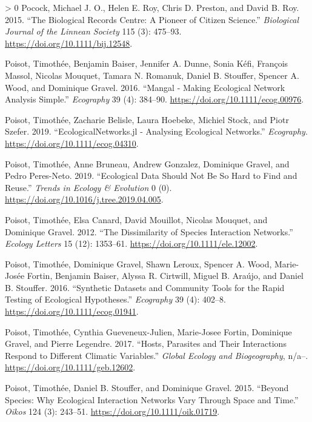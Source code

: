 \documentclass[11pt]{article}
\newlength{\cslhangindent}
\newenvironment{CSLReferences}[3] %
 {%
  \setlength{\parindent}{0pt}
  \ifodd #1 \everypar{\setlength{\hangindent}{\cslhangindent}}\ignorespaces\fi
  \ifnum #2 > 0
  \setlength{\parskip}{#2\baselineskip}
  \fi
 }%
 {}
\begin{document}
\begin{CSLReferences}{1}{0}
\leavevmode\hypertarget{ref-Pocock2015BioRec}{}%
Pocock, Michael J. O., Helen E. Roy, Chris D. Preston, and David B. Roy.
2015. {``The Biological Records Centre: A Pioneer of Citizen Science.''}
\emph{Biological Journal of the Linnean Society} 115 (3): 475--93.
\url{https://doi.org/10.1111/bij.12548}.

\leavevmode\hypertarget{ref-Poisot2016ManMak}{}%
Poisot, Timothée, Benjamin Baiser, Jennifer A. Dunne, Sonia Kéfi,
François Massol, Nicolas Mouquet, Tamara N. Romanuk, Daniel B. Stouffer,
Spencer A. Wood, and Dominique Gravel. 2016. {``Mangal - Making
Ecological Network Analysis Simple.''} \emph{Ecography} 39 (4): 384--90.
\url{https://doi.org/10.1111/ecog.00976}.

\leavevmode\hypertarget{ref-Poisot2019EcoJl}{}%
Poisot, Timothée, Zacharie Belisle, Laura Hoebeke, Michiel Stock, and
Piotr Szefer. 2019. {``EcologicalNetworks.jl - Analysing Ecological
Networks.''} \emph{Ecography}. \url{https://doi.org/10.1111/ecog.04310}.

\leavevmode\hypertarget{ref-Poisot2019EcoDat}{}%
Poisot, Timothée, Anne Bruneau, Andrew Gonzalez, Dominique Gravel, and
Pedro Peres-Neto. 2019. {``Ecological Data Should Not Be So Hard to Find
and Reuse.''} \emph{Trends in Ecology \& Evolution} 0 (0).
\url{https://doi.org/10.1016/j.tree.2019.04.005}.

\leavevmode\hypertarget{ref-Poisot2012DisSpe}{}%
Poisot, Timothée, Elsa Canard, David Mouillot, Nicolas Mouquet, and
Dominique Gravel. 2012. {``The Dissimilarity of Species Interaction
Networks.''} \emph{Ecology Letters} 15 (12): 1353--61.
\url{https://doi.org/10.1111/ele.12002}.

\leavevmode\hypertarget{ref-Poisot2016SynDat}{}%
Poisot, Timothée, Dominique Gravel, Shawn Leroux, Spencer A. Wood,
Marie-Josée Fortin, Benjamin Baiser, Alyssa R. Cirtwill, Miguel B.
Araújo, and Daniel B. Stouffer. 2016. {``Synthetic Datasets and
Community Tools for the Rapid Testing of Ecological Hypotheses.''}
\emph{Ecography} 39 (4): 402--8.
\url{https://doi.org/10.1111/ecog.01941}.

\leavevmode\hypertarget{ref-Poisot2017HosPar}{}%
Poisot, Timothée, Cynthia Gueveneux-Julien, Marie-Josee Fortin,
Dominique Gravel, and Pierre Legendre. 2017. {``Hosts, Parasites and
Their Interactions Respond to Different Climatic Variables.''}
\emph{Global Ecology and Biogeography}, n/a--.
\url{https://doi.org/10.1111/geb.12602}.

\leavevmode\hypertarget{ref-Poisot2015SpeWhy}{}%
Poisot, Timothée, Daniel B. Stouffer, and Dominique Gravel. 2015.
{``Beyond Species: Why Ecological Interaction Networks Vary Through
Space and Time.''} \emph{Oikos} 124 (3): 243--51.
\url{https://doi.org/10.1111/oik.01719}.


\end{CSLReferences}
\end{document}
